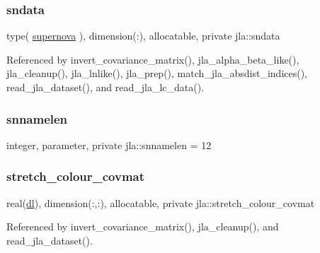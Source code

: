 \mbox{\label{namespacejla_a9e2b90e3f1e2fbd40d61e0ad31bb2684}} 
\subsubsection{\texorpdfstring{sndata}{sndata}}
{\footnotesize\ttfamily type( \mbox{\hyperlink{structjla_1_1supernova}{supernova}} ), dimension(\+:), allocatable, private jla\+::sndata\hspace{0.3cm}{\ttfamily [private]}}



Referenced by invert\+\_\+covariance\+\_\+matrix(), jla\+\_\+alpha\+\_\+beta\+\_\+like(), jla\+\_\+cleanup(), jla\+\_\+lnlike(), jla\+\_\+prep(), match\+\_\+jla\+\_\+absdist\+\_\+indices(), read\+\_\+jla\+\_\+dataset(), and read\+\_\+jla\+\_\+lc\+\_\+data().

\mbox{\label{namespacejla_a211c3f57dbbc51d6959058d935cc0fb6}} 
\subsubsection{\texorpdfstring{snnamelen}{snnamelen}}
{\footnotesize\ttfamily integer, parameter, private jla\+::snnamelen = 12\hspace{0.3cm}{\ttfamily [private]}}

\mbox{\label{namespacejla_a22070c0614b05ee2b305729eddeb3d9d}} 
\subsubsection{\texorpdfstring{stretch\+\_\+colour\+\_\+covmat}{stretch\_colour\_covmat}}
{\footnotesize\ttfamily real(\mbox{\hyperlink{namespacejla_a3aa6435b4e08f1d532390186ac608741}{dl}}), dimension(\+:,\+:), allocatable, private jla\+::stretch\+\_\+colour\+\_\+covmat\hspace{0.3cm}{\ttfamily [private]}}



Referenced by invert\+\_\+covariance\+\_\+matrix(), jla\+\_\+cleanup(), and read\+\_\+jla\+\_\+dataset().

